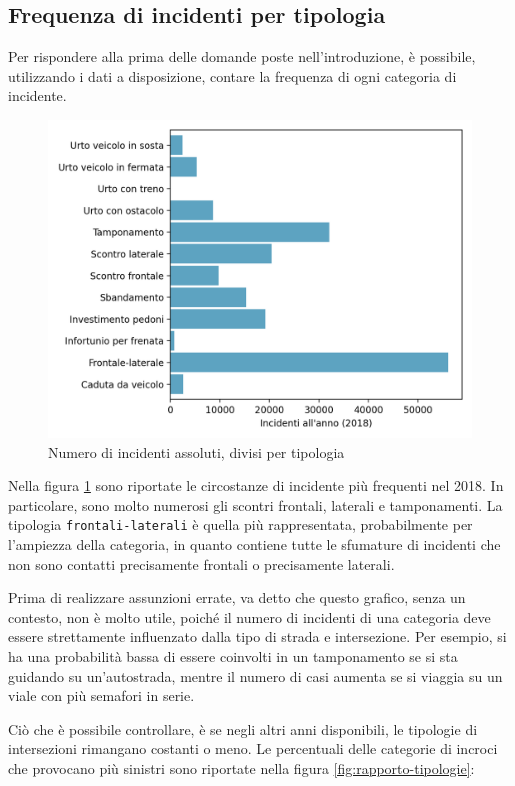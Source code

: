 \documentclass[a4paper]{report}
\newcommand{\columnstyle}[1]{\texttt{#1}}
\begin{document}
\subsection{Frequenza di incidenti per tipologia}

Per rispondere alla prima delle domande poste nell'introduzione, è possibile, 
utilizzando i dati a disposizione, contare la frequenza di ogni categoria di incidente. 

\begin{figure}
    \hfill\includegraphics[width=0.7\linewidth]{../src/incidenti/incidenti_senza_coords/localizzazione_incidente/tipo_incidente.png}\hspace*{\fill}
    \caption{Numero di incidenti assoluti, divisi per tipologia}
    \label{fig:tipo-incidente}
\end{figure}

Nella figura \ref{fig:tipo-incidente} sono riportate le circostanze di 
incidente più frequenti nel 2018. 
In particolare, sono molto numerosi gli scontri frontali, laterali e tamponamenti. 
La tipologia \columnstyle{frontali-laterali} è quella più rappresentata, 
probabilmente per l'ampiezza della categoria, in quanto contiene 
tutte le sfumature di incidenti che non sono 
contatti precisamente frontali o precisamente laterali. 

Prima di realizzare assunzioni errate, va detto che questo grafico, senza un contesto, 
non è molto utile, poiché il numero di incidenti di una categoria deve 
essere strettamente influenzato dalla tipo di strada e intersezione. 
Per esempio, si ha una probabilità bassa di essere coinvolti in un tamponamento 
se si sta guidando su un'autostrada, mentre il numero di casi aumenta se si viaggia 
su un viale con più semafori in serie. 

Ciò che è possibile controllare, è se negli altri anni disponibili, le 
tipologie di intersezioni rimangano costanti o meno. 
Le percentuali delle categorie di incroci che provocano più sinistri 
sono riportate nella figura \ref{fig:rapporto-tipologie}: 
\end{document}

